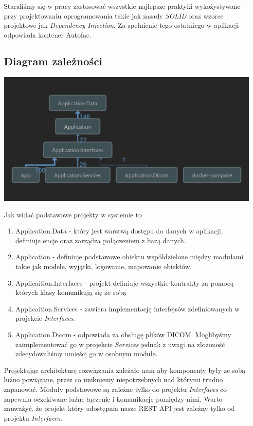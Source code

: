 \documentclass[a4paper,11pt,twoside]{report}
\theoremstyle{definition}
\begin{document}
Staraliśmy się w pracy zastosować wszystkie najlepsze praktyki wykożystywane przy projektowaniu oprogramowania takie jak zasady \textit{SOLID} oraz wzorce projektowe jak \textit{Dependency Injection}. Za spełnienie tego ostatniego w aplikacji odpowiada kontener Autofac.

\subsection{Diagram zależności}
\begin{minipage}{\linewidth}
	\centering
	\includegraphics[width=\textwidth]{Backend/ApplicationDependencies.png}
\end{minipage}

Jak widać podstawowe projekty w systemie to
\begin{enumerate}
\item Application.Data - który jest warstwą dostępu do danych w aplikacji, definiuje encje oraz zarządza połączeniem z bazą danych.
\item Application - definiuje podstawowe obiektu współdzielone między modułami takie jak modele, wyjątki, logowanie, mapowanie obiektów.
\item Applicaition.Interfaces - projekt definiuje wszystkie kontrakty za pomocą których klasy komunikują się ze sobą
\item Applicaition.Services - zawiera implementację interfejsów zdefiniowanych w projekcie \textit{Interfaces}.
\item Application.Dicom - odpowiada za obsługę plików DICOM. Moglibyśmy zaimplementować go w projekcie \textit{Services} jednak z uwagi na złożoność zdecydowaliśmy umieści go w osobnym module.
\end{enumerate}

Projektując architekturę rozwiązania zależało nam aby komponenty były ze sobą luźno powiązane, przez co unikniemy niepotrzebnych nad którymi trudno zapanować. Moduły podstawowe są zależne tylko do projektu \textit{Interfaces} co zapewnia oczekiwane luźne łączenie i komunikację pomiędzy nimi. Warto zauważyć, że projekt który udostępnia nasze REST API jest zależny tylko od projektu \textit{Interfaces}.
\end{document}
